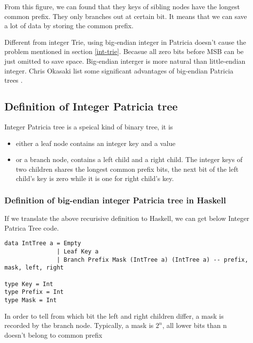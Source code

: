 \documentclass{article}
\begin{document}
From this figure, we can found that they keys of sibling nodes have the longest common prefix.
They only branches out at certain bit. It means that we can save a lot of data by storing the common
prefix. 

Different from integer Trie, using big-endian integer in Patricia doesn't cause the problem mentioned
in section \ref{int-trie}. Becasue all zero bits before MSB can be just omitted to save space. Big-endian
interger is more natural than little-endian integer. Chris Okasaki list some significant advantages
of big-endian Patricia trees \cite{okasaki-int-map}.

\subsection{Definition of Integer Patricia tree}
Integer Patricia tree is a speical kind of binary tree, it is
\begin{itemize}
\item either a leaf node contains an integer key and a value
\item or a branch node, contains a left child and a right child. The
integer keys of two children shares the longest common prefix bits,
the next bit of the left child's key is zero while it is one for right
child's key.
\end{itemize}

\subsubsection*{Definition of big-endian integer Patricia tree in Haskell}
If we translate the above recurisive definition to Haskell, we can get
below Integer Patrica Tree code.

\lstset{language=Haskell}
\begin{lstlisting}
data IntTree a = Empty 
               | Leaf Key a
               | Branch Prefix Mask (IntTree a) (IntTree a) -- prefix, mask, left, right

type Key = Int
type Prefix = Int
type Mask = Int
\end{lstlisting}

In order to tell from which bit the left and right children differ, a
mask is recorded by the branch node. Typically, a mask is $2^n$, all
lower bits than n doesn't belong to common prefix
\end{document}
